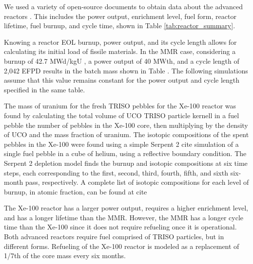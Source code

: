 We used a variety of open-source documents to obtain data about the advanced reactors
\cite{mitchell_usnc_2020, hawari_development_2018, venneri_neutronic_2015, 
harlan_x-energy_2018, hussain_advances_2018}. 
This includes 
the power output, enrichment level, fuel form, reactor lifetime, fuel 
burnup, and cycle time, shown in Table \ref{tab:reactor_summary}. 

Knowing a reactor \gls{EOL} burnup, power output, and its cycle length
allows for calculating its initial load of fissile materials.
In the MMR case, considering a burnup of 42.7 MWd/kgU \cite{hawari_development_2018},
a power output of 40 MWth, and a cycle length of 2,042 EFPD \cite{venneri_neutronic_2015}
results in the batch mass shown in Table \label{tab:reactor_summary}.
The following simulations assume that this value remains constant for the
power output and cycle length specified in the same table.

The mass of uranium for the fresh \gls{TRISO} pebbles for the Xe-100 
reactor was found by calculating the total volume of UCO \gls{TRISO} particle
kernell in a fuel pebble the number of pebbles in the Xe-100 core, then 
multiplying by the density of UCO and the mass fraction of uranium. 
The isotopic compositions of the spent pebbles in the Xe-100 were found using a simple 
Serpent 2 cite %
simulation of a single fuel pebble in a cube of helium, using a 
reflective boundary condition.  The Serpent 2 depletion model finds the burnup 
and isotopic compositions at six time steps, each corresponding to the first, 
second, third, fourth, fifth, and sixth six-month pass, respectively.  A 
complete list of isotopic compositions for each level of burnup, in atomic 
fraction, can be found at cite %

The Xe-100 reactor has a larger power output, requires a higher enrichment 
level, and has a longer lifetime than the \gls{MMR}. However, the 
\gls{MMR} has a longer cycle time than the Xe-100 since it does not require 
refueling once it is operational. Both advanced reactors require fuel 
comprised of \gls{TRISO} particles, but in different forms. Refueling 
of the Xe-100 reactor is modeled as a replacement of 1/7th of the core mass 
every six months.  

